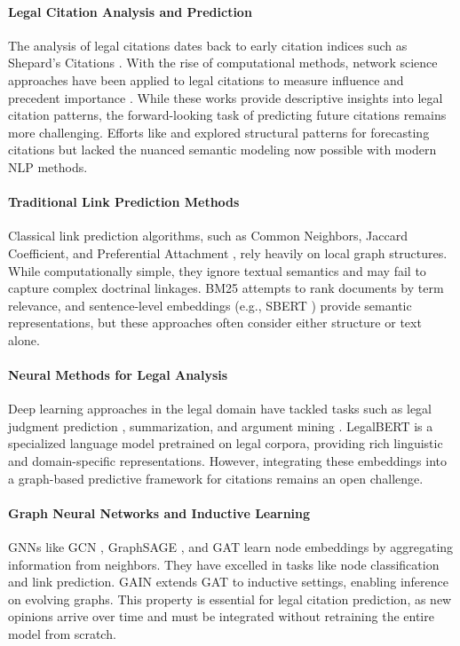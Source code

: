 \documentclass{article}
\begin{document}
\paragraph{Legal Citation Analysis and Prediction}
The analysis of legal citations dates back to early citation indices such as Shepard's Citations \citep{mersky_fundamentals_2002}. With the rise of computational methods, network science approaches have been applied to legal citations to measure influence and precedent importance \citep{fowler2007network,bommarito2010network}. While these works provide descriptive insights into legal citation patterns, the forward-looking task of predicting future citations remains more challenging. Efforts like \citet{knight2002network} and \citet{post2000fractal} explored structural patterns for forecasting citations but lacked the nuanced semantic modeling now possible with modern NLP methods.

\paragraph{Traditional Link Prediction Methods}
Classical link prediction algorithms, such as Common Neighbors, Jaccard Coefficient, and Preferential Attachment \citep{liben2007link}, rely heavily on local graph structures. While computationally simple, they ignore textual semantics and may fail to capture complex doctrinal linkages. BM25 \citep{robertson2009probabilistic} attempts to rank documents by term relevance, and sentence-level embeddings (e.g., SBERT \citep{reimers2019sentence}) provide semantic representations, but these approaches often consider either structure or text alone.

\paragraph{Neural Methods for Legal Analysis}
Deep learning approaches in the legal domain have tackled tasks such as legal judgment prediction \citep{aletras_predicting_2016}, summarization, and argument mining \citep{zhong-etal-2018-legal}. LegalBERT \citep{chalkidis-etal-2020-legalbert} is a specialized language model pretrained on legal corpora, providing rich linguistic and domain-specific representations. However, integrating these embeddings into a graph-based predictive framework for citations remains an open challenge.

\paragraph{Graph Neural Networks and Inductive Learning}
GNNs like GCN \citep{kipf2016semi}, GraphSAGE \citep{hamilton2018inductive}, and GAT \citep{velivckovic2018graph} learn node embeddings by aggregating information from neighbors. They have excelled in tasks like node classification and link prediction. GAIN \citep{weng2022gain} extends GAT to inductive settings, enabling inference on evolving graphs. This property is essential for legal citation prediction, as new opinions arrive over time and must be integrated without retraining the entire model from scratch.
\end{document}
